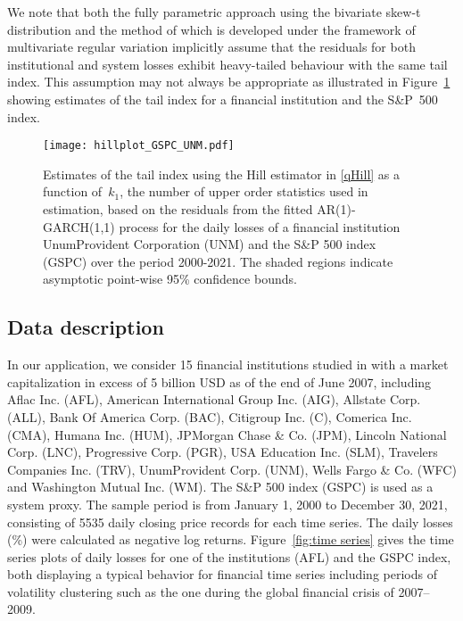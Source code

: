 \documentclass[11pt,letterpaper]{article}
\numberwithin{equation}{section}
\begin{document}
We note that both the fully parametric approach using the bivariate skew-t distribution and the method of \cite{NoldeZhang2018} which is developed under the framework of multivariate regular variation implicitly assume that the residuals for both institutional and system losses exhibit heavy-tailed behaviour with the same tail index. This assumption may not always be appropriate as illustrated in Figure~\ref{fig:hill} showing estimates of the tail index for a financial institution and the S\&P~500 index. 


\begin{figure}[h]
  \centering 
    \texttt{[image: hillplot\_GSPC\_UNM.pdf]}
    \caption{Estimates of the tail index using the Hill estimator in \eqref{qHill}  as a function of~$k_1$, the number of upper order statistics used in estimation, based on the residuals from the fitted  AR(1)-GARCH(1,1) process for the daily losses of a financial institution UnumProvident Corporation (UNM) and the S\&P 500 index (GSPC) over the period 2000-2021. The shaded regions indicate asymptotic point-wise 95\% confidence bounds.}
  \label{fig:hill}
\end{figure}


\subsection{Data description}\label{data}

In our application, we consider 15 financial institutions studied in \cite{Acharya_etal2017} with a market capitalization in excess of 5 billion USD as of the end of June 2007, including Aflac Inc. (AFL), American International Group Inc. (AIG), Allstate Corp. (ALL), Bank Of America Corp. (BAC), Citigroup Inc. (C), Comerica Inc. (CMA), Humana Inc. (HUM), JPMorgan Chase \& Co. (JPM), Lincoln National Corp. (LNC), Progressive Corp. (PGR), USA Education Inc. (SLM), Travelers Companies Inc. (TRV), UnumProvident Corp. (UNM), Wells Fargo \& Co. (WFC) and Washington Mutual Inc. (WM). The S\&P 500 index (GSPC) is used as a system proxy. The sample period is from January 1, 2000 to December 30, 2021, consisting of 5535 daily closing price records for each time series. The daily losses (\%) were calculated as negative log returns. Figure~\ref{fig:time series} gives the time series plots of daily losses for one of the institutions (AFL) and the GSPC index, both displaying a typical behavior for financial time series including periods of volatility clustering such as the one during the global financial crisis of 2007--2009.
\end{document}
